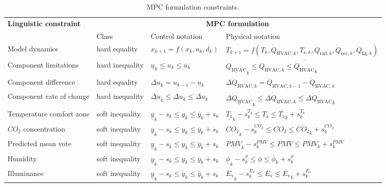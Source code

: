 \documentclass[10pt]{extarticle}
\begin{document}
\renewcommand{\arraystretch}{2.5}
\begin{table}[h]
	\centering
	\caption{MPC formulation constraints.}
	\label{tab:mpc_form:constraints}
	\begin{adjustwidth}{-1cm}{}
	\begin{tabular}{l|lll}
		\toprule
		\textbf{Linguistic constraint}  &  \multicolumn{3}{c}{\textbf{MPC formulation}} \\
		& Class &  Control notation &  Physical notation \\
		\midrule
		Model dynamics & hard equality & $ x_{k+1} = f(x_k,u_k,d_k) $  & $ T_{k+1} = f(T_k,\dot{Q}_{\text{HVAC},k},T_{\text{e},k},\dot{Q}_{\text{rad},k},\dot{Q}_{\text{occ},k},\dot{Q}_{\text{lig},k}) $ \\ 
		Component limitations & hard inequality & $ \underline{u}_k \le u_k \le \overline{u}_k  $  & $ \underline{\dot{Q}_{\text{HVAC}}}_k  \le \dot{Q}_{\text{HVAC},k}  \le \overline{\dot{Q}_{\text{HVAC}}}_k  $ \\ 
		Component difference & hard equality & $\Delta u_k = u_{k-1} - u_k $  & $\Delta \dot{Q}_{\text{HVAC},k} = \dot{Q}_{\text{HVAC},k-1} - \dot{Q}_{\text{HVAC},k} $  \\ 
		Component rate of change & hard inequality & $ \underline{\Delta u}_k   \le \Delta u_k  \le \overline{\Delta u}_k  $ & $ \underline{\Delta \dot{Q}_{\text{HVAC}}}_k   \le \Delta \dot{Q}_{\text{HVAC},k}  \le \overline{\Delta \dot{Q}_{\text{HVAC}}}_k  $ \\ 
		Temperature comfort zone & soft inequality & $ \underline{y}_k - s_k \le y_k \le \overline{y}_k + s_k $  & $ \underline{T_{\text{z}}}_k - s^{T_{\text{z}}}_{k} \le T_{\text{z}} \le \overline{T_{\text{z}}}_k + s^{T_{\text{z}}}_{k} $ \\
		$CO_2$ concentration & soft inequality & $ \underline{y}_k - s_k \le y_k \le \overline{y}_k + s_k $ & $ \underline{{CO_2}}_k - s^{CO_2}_k \le CO_2 \le \overline{{CO_2}}_k + s^{CO_2}_k $  \\
		Predicted mean vote &  soft inequality & $ \underline{y}_k - s_k \le y_k \le \overline{y}_k + s_k $ & $ \underline{PMV}_k - s^{PMV}_k \le PMV \le \overline{PMV}_k + s^{PMV}_k $  \\
		Humidity & soft inequality & $ \underline{y}_k - s_k \le y_k \le \overline{y}_k + s_k $ & $ \underline{\phi}_k - s^{\phi}_k \le \phi \le \overline{\phi}_k + s^{\phi}_k $  \\
		Illuminance & soft inequality & $ \underline{y}_k - s_k \le y_k \le \overline{y}_k + s_k $ & $ \underline{{E_\text{v}}}_k - s^{E_\text{v}}_k \le E_\text{v} \le \overline{{E_\text{v}}}_k + s^{E_\text{v}}_k $  \\
		\bottomrule 
	\end{tabular}
	\end{adjustwidth}
\end{table}
\end{document}
